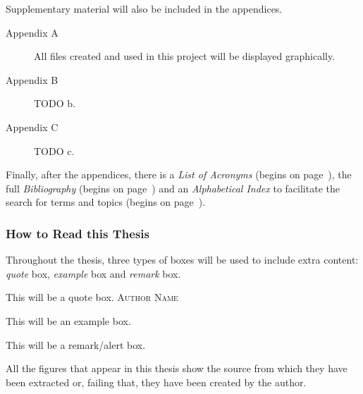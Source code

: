 Supplementary material will also be included in the appendices.

\begin{description}
  \item[Appendix A] All files created and used in this project will be
  displayed graphically. 
  \item[Appendix B] TODO b. 
  \item[Appendix C] TODO c. 
\end{description}

Finally, after the appendices, there is a \textsl{List of Acronyms} (begins on
page~\pageref{cha:acronyms}), the full \textsl{Bibliography} (begins on
page~\pageref{cha:references}) and an \textsl{Alphabetical Index} to facilitate
the search for terms and topics (begins on page~\pageref{cha:index}).

\subsubsection{How to Read this Thesis}

Throughout the thesis, three types of boxes will be used to include extra
content: \emph{quote} box, \emph{example} box and \emph{remark} box.

\begin{quoteBox}
  This will be a quote box.
  \tcblower\textsc{Author Name}
\end{quoteBox}

\begin{exampleBox}
  This will be an example box.
\end{exampleBox}

\begin{remarkBox}
  This will be a remark/alert box.
\end{remarkBox}

All the figures that appear in this thesis show the source from which they have
been extracted or, failing that, they have been created by the author.
